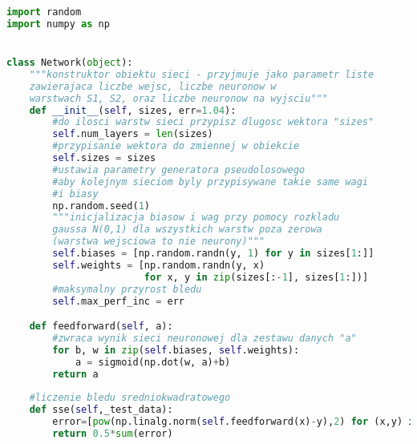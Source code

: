 \documentclass[12pt,twoside]{article}
\begin{document}
\begin{lstlisting}[language=Python,caption=Algorytm uczenia sieci,label={Kod2}]
import random
import numpy as np


class Network(object):
    """konstruktor obiektu sieci - przyjmuje jako parametr liste 
    zawierajaca liczbe wejsc, liczbe neuronow w 
    warstwach S1, S2, oraz liczbe neuronow na wyjsciu"""
    def __init__(self, sizes, err=1.04):
        #do ilosci warstw sieci przypisz dlugosc wektora "sizes"
        self.num_layers = len(sizes)
        #przypisanie wektora do zmiennej w obiekcie
        self.sizes = sizes
        #ustawia parametry generatora pseudolosowego
        #aby kolejnym sieciom byly przypisywane takie same wagi 
        #i biasy
        np.random.seed(1)
        """inicjalizacja biasow i wag przy pomocy rozkladu 
        gaussa N(0,1) dla wszystkich warstw poza zerowa 
        (warstwa wejsciowa to nie neurony)"""
        self.biases = [np.random.randn(y, 1) for y in sizes[1:]]
        self.weights = [np.random.randn(y, x)
                        for x, y in zip(sizes[:-1], sizes[1:])]
        #maksymalny przyrost bledu
        self.max_perf_inc = err

    def feedforward(self, a):
        #zwraca wynik sieci neuronowej dla zestawu danych "a"
        for b, w in zip(self.biases, self.weights):
            a = sigmoid(np.dot(w, a)+b)
        return a
    
    #liczenie bledu sredniokwadratowego
    def sse(self,_test_data):
        error=[pow(np.linalg.norm(self.feedforward(x)-y),2) for (x,y) in _test_data]
        return 0.5*sum(error)    


\end{lstlisting}
\end{document}
